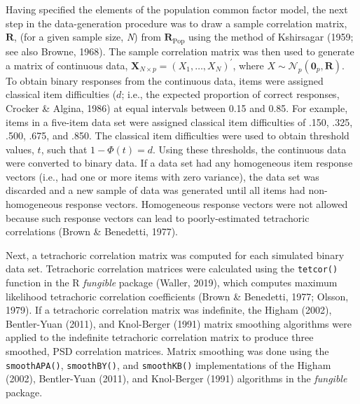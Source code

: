 \documentclass[
  english,
  man]{apa6}
\begin{document}
Having specified the elements of the population common factor model, the next step in the data-generation procedure was to draw a sample correlation matrix, \(\mathbf{R}\), (for a given sample size, \emph{N}) from \(\mathbf{R}_{\textrm{Pop}}\) using the method of Kshirsagar (1959; see also Browne, 1968). The sample correlation matrix was then used to generate a matrix of continuous data, \(\mathbf{X}_{N \times p} = (X_1, \dots, X_N)^\prime\), where \(X \sim \mathcal{N}_p(\mathbf{0}_p, \mathbf{R})\). To obtain binary responses from the continuous data, items were assigned classical item difficulties (\(d\); i.e., the expected proportion of correct responses, Crocker \& Algina, 1986) at equal intervals between 0.15 and 0.85. For example, items in a five-item data set were assigned classical item difficulties of .150, .325, .500, .675, and .850. The classical item difficulties were used to obtain threshold values, \(t\), such that \(1 - \Phi(t) = d\). Using these thresholds, the continuous data were converted to binary data. If a data set had any homogeneous item response vectors (i.e., had one or more items with zero variance), the data set was discarded and a new sample of data was generated until all items had non-homogeneous response vectors. Homogeneous response vectors were not allowed because such response vectors can lead to poorly-estimated tetrachoric correlations (Brown \& Benedetti, 1977).

Next, a tetrachoric correlation matrix was computed for each simulated binary data set. Tetrachoric correlation matrices were calculated using the \texttt{tetcor()} function in the R \emph{fungible} package (Waller, 2019), which computes maximum likelihood tetrachoric correlation coefficients (Brown \& Benedetti, 1977; Olsson, 1979). If a tetrachoric correlation matrix was indefinite, the Higham (2002), Bentler-Yuan (2011), and Knol-Berger (1991) matrix smoothing algorithms were applied to the indefinite tetrachoric correlation matrix to produce three smoothed, PSD correlation matrices. Matrix smoothing was done using the \texttt{smoothAPA()}, \texttt{smoothBY()}, and \texttt{smoothKB()} implementations of the Higham (2002), Bentler-Yuan (2011), and Knol-Berger (1991) algorithms in the \emph{fungible} package.
\end{document}
